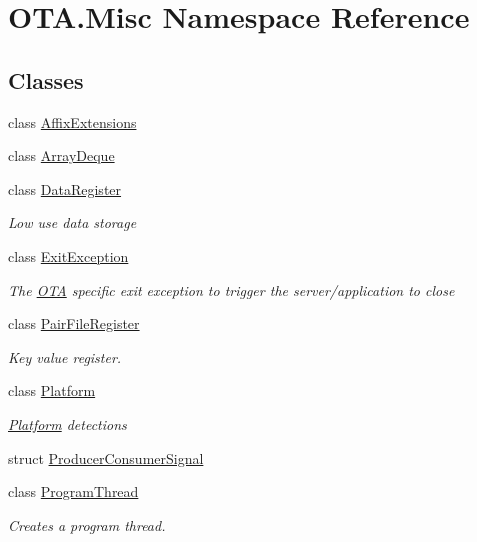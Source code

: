 \hypertarget{namespaceOTA_1_1Misc}{}\section{O\+T\+A.\+Misc Namespace Reference}
\label{namespaceOTA_1_1Misc}
\subsection*{Classes}
\begin{DoxyCompactItemize}
\item 
class \hyperlink{classOTA_1_1Misc_1_1AffixExtensions}{Affix\+Extensions}
\item 
class \hyperlink{classOTA_1_1Misc_1_1ArrayDeque}{Array\+Deque}
\item 
class \hyperlink{classOTA_1_1Misc_1_1DataRegister}{Data\+Register}
\begin{DoxyCompactList}\small\item\em Low use data storage \end{DoxyCompactList}\item 
class \hyperlink{classOTA_1_1Misc_1_1ExitException}{Exit\+Exception}
\begin{DoxyCompactList}\small\item\em The \hyperlink{namespaceOTA}{O\+T\+A} specific exit exception to trigger the server/application to close \end{DoxyCompactList}\item 
class \hyperlink{classOTA_1_1Misc_1_1PairFileRegister}{Pair\+File\+Register}
\begin{DoxyCompactList}\small\item\em Key value register. \end{DoxyCompactList}\item 
class \hyperlink{classOTA_1_1Misc_1_1Platform}{Platform}
\begin{DoxyCompactList}\small\item\em \hyperlink{classOTA_1_1Misc_1_1Platform}{Platform} detections \end{DoxyCompactList}\item 
struct \hyperlink{structOTA_1_1Misc_1_1ProducerConsumerSignal}{Producer\+Consumer\+Signal}
\item 
class \hyperlink{classOTA_1_1Misc_1_1ProgramThread}{Program\+Thread}
\begin{DoxyCompactList}\small\item\em Creates a program thread. \end{DoxyCompactList}\item 

\end{DoxyCompactItemize}
